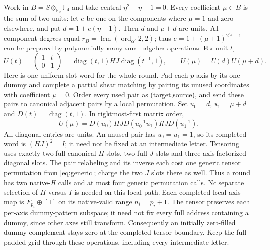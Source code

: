 \documentclass[11pt]{article}
\newcommand{\F}{\mathbb F}
\begin{document}
Work in $B=S\otimes_{\F_2}\F_4$ and take central
$\eta^2+\eta+1=0$. Every coefficient $\mu\in B$ is the sum of two
units: let $e$ be one on the components where $\mu=1$ and zero
elsewhere, and put $d=1+e(\eta+1)$. Then $d$ and $\mu+d$ are units.
All component degrees equal $r_B=\operatorname{lcm}(\operatorname{ord}_{\alpha'}2,2)$;
thus $e=1+(\mu+1)^{2^{r_B}-1}$ can be prepared by polynomially many
small-algebra operations. For unit $t$,
\[
 U(t)=\begin{pmatrix}1&t\\0&1\end{pmatrix}
 =\operatorname{diag}(t,1)HJ\operatorname{diag}(t^{-1},1),
 \qquad U(\mu)=U(d)U(\mu+d).
\]
Here is one uniform slot word for the whole round. Pad each $p$ axis
by its one dummy and complete a partial shear matching by pairing
its unused coordinates with coefficient $\mu=0$. Order every used
pair as (target,source), and send these pairs to canonical adjacent
pairs by a local permutation. Set $u_0=d$, $u_1=\mu+d$ and
$D(t)=\operatorname{diag}(t,1)$. In rightmost-first matrix order,
\[
 U(\mu)=D(u_0)HJ D(u_0^{-1}u_1)HJ D(u_1^{-1}).
\]
All diagonal entries are units. An unused pair has $u_0=u_1=1$,
so its completed word is $(HJ)^2=I$; it need not be fixed at an
intermediate letter. Tensoring uses exactly two full canonical $H$
slots, two full $J$ slots and three axis-factorized diagonal slots.
The pair relabeling and its inverse each cost one generic tensor
permutation from \eqref{eq:generic}; charge the two $J$ slots there
as well. Thus a round has two native-$H$ calls and at most four
generic permutation calls. No separate selection of $H$ versus $I$
is needed on this local path. Each completed local axis map is
$F_{p_i}\oplus[1]$ on its native-valid range $n_i=p_i+1$.
The tensor preserves each per-axis dummy-pattern subspace; it need
not fix every full address containing a dummy, since other axes still
transform. Consequently an initially zero-filled dummy complement
stays zero at the completed tensor boundary. Keep the full padded
grid through these operations, including every intermediate letter.
\end{document}
